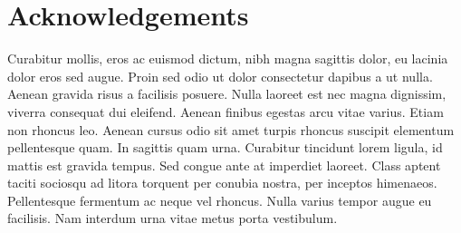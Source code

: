 \chapter*{Acknowledgements}
Curabitur mollis, eros ac euismod dictum, nibh magna sagittis dolor, eu lacinia dolor eros sed augue. Proin sed odio ut dolor consectetur dapibus a ut nulla. Aenean gravida risus a facilisis posuere. Nulla laoreet est nec magna dignissim, viverra consequat dui eleifend. Aenean finibus egestas arcu vitae varius. Etiam non rhoncus leo. Aenean cursus odio sit amet turpis rhoncus suscipit elementum pellentesque quam. In sagittis quam urna. Curabitur tincidunt lorem ligula, id mattis est gravida tempus. Sed congue ante at imperdiet laoreet. Class aptent taciti sociosqu ad litora torquent per conubia nostra, per inceptos himenaeos. Pellentesque fermentum ac neque vel rhoncus. Nulla varius tempor augue eu facilisis. Nam interdum urna vitae metus porta vestibulum.